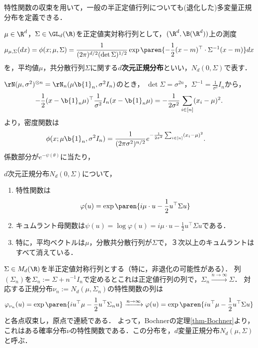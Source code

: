 \documentclass[uplatex,dvipdfmx]{jsreport}
\begin{document}
\begin{tcolorbox}[colframe=ForestGreen, colback=ForestGreen!10!white,breakable,colbacktitle=ForestGreen!40!white,coltitle=black,fonttitle=\bfseries\sffamily,
    title=]
    特性関数の収束を用いて，一般の半正定値行列についても(退化した)多変量正規分布を定義できる．
\end{tcolorbox}

\begin{definition}
    $\mu\in\R^d$，$\Sigma\in\GL_d(\R)$を正定値実対称行列として，$(\R^d,\B(\R^d))$上の測度
    \[\mu_{\mu,\Sigma}(dx)=\phi(x;\mu,\Sigma)=\frac{1}{(2\pi)^{d/2}(\det\Sigma)^{1/2}}\exp\paren{-\frac{1}{2}(x-m)^\top\cdot\Sigma^{-1}(x-m)}dx\]
    を，平均値$\mu$，共分散行列$\Sigma$に関する\textbf{$d$次元正規分布}といい，$N_d(0,\Sigma)$で表す．
\end{definition}
\begin{example}
    $\rN(\mu,\sigma^2)^{\otimes n}=\rN_n(\mu\b{1}_n,\sigma^2I_n)$のとき，
    $\det\Sigma=\sigma^{2n}$，$\Sigma^{-1}=\frac{1}{\sigma^2}I_n$から，
    \[-\frac{1}{2}(x-\b{1}_n\mu)^\top\frac{1}{\sigma^2}I_n(x-\b{1}_n\mu)=-\frac{1}{2\sigma^2}\sum_{i\in[n]}(x_i-\mu)^2.\]
    より，密度関数は
    \begin{align*}
        \phi(x;\mu\b{1}_n,\sigma^2I_n)&=\frac{1}{(2\pi\sigma^2)^{n/2}}e^{-\frac{1}{2\sigma^2}\sum_{i\in[n]}(x_i-\mu)^2}.
    \end{align*}
    係数部分が$e^{-\psi(\theta)}$に当たり，
\end{example}

\begin{proposition}[多変量正規分布の母関数]
    $d$次元正規分布$N_d(0,\Sigma)$について，
    \begin{enumerate}
        \item 特性関数は\[\varphi(u)=\exp\paren{i\mu\cdot u-\frac{1}{2}u^\top\Sigma u}\]
        \item キュムラント母関数は$\psi(u)=\log\varphi(u)=i\mu\cdot u-\frac{1}{2}u^\top\Sigma u$である．
        \item 特に，平均ベクトルは$\mu$，分散共分散行列が$\Sigma$で，３次以上のキュムラントはすべて消えている．
    \end{enumerate}
\end{proposition}

\begin{definition}[半正定値対称行列が定める多変量正規分布]
    $\Sigma\in M_d(\R)$を半正定値対称行列とする（特に，非退化の可能性がある）．
    列$(\Sigma_n)$を$\Sigma_n:=\Sigma+n^{-1}I_n$で定めるとこれは正定値行列の列で，$\Sigma_n\xrightarrow{n\to\infty}\Sigma$．
    対応する正規分布$\nu_n:=N_d(\mu,\Sigma_n)$の特性関数の列は
    \[\varphi_{\nu_n}(u)=\exp\paren{iu^\top\mu-\frac{1}{2}u^\top\Sigma_nu}\xrightarrow{n\to\infty}\varphi(u)=\exp\paren{iu^\top\mu-\frac{1}{2}u^\top\Sigma u}\]
    と各点収束し，原点で連続である．
    よって，Bochnerの定理\ref{thm-Bochner}より，これはある確率分布$\nu$の特性関数である．この分布を，$d$変量正規分布$N_d(\mu,\Sigma)$と呼ぶ．
\end{definition}
\end{document}
